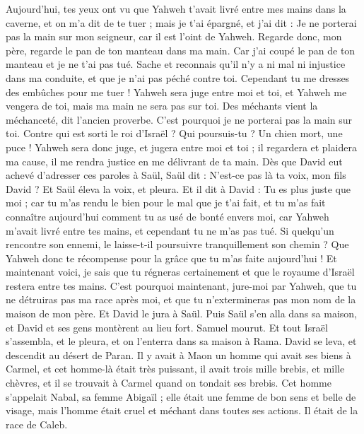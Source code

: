 \begin{multicols}{2}
Aujourd'hui, tes yeux ont vu que Yahweh t'avait livré entre mes mains dans la caverne, et on m'a dit de te tuer ; mais je t'ai épargné, et j'ai dit : Je ne porterai pas la main sur mon seigneur, car il est l'oint de Yahweh.
Regarde donc, mon père, regarde le pan de ton manteau dans ma main. Car j’ai coupé le pan de ton manteau et je ne t'ai pas tué. Sache et reconnais qu'il n'y a ni mal ni injustice dans ma conduite, et que je n'ai pas péché contre toi. Cependant tu me dresses des embûches pour me tuer !
Yahweh sera juge entre moi et toi, et Yahweh me vengera de toi, mais ma main ne sera pas sur toi.
Des méchants vient la méchanceté, dit l’ancien proverbe. C'est pourquoi je ne porterai pas la main sur toi.
Contre qui est sorti le roi d'Israël ? Qui poursuis-tu ? Un chien mort, une puce !
Yahweh sera donc juge, et jugera entre moi et toi ; il regardera et plaidera ma cause, il me rendra justice en me délivrant de ta main.
Dès que David eut achevé d’adresser ces paroles à Saül, Saül dit : N'est-ce pas là ta voix, mon fils David ? Et Saül éleva la voix, et pleura.
Et il dit à David : Tu es plus juste que moi ; car tu m'as rendu le bien pour le mal que je t'ai fait,
et tu m'as fait connaître aujourd'hui comment tu as usé de bonté envers moi, car Yahweh m'avait livré entre tes mains, et cependant tu ne m'as pas tué.
Si quelqu’un rencontre son ennemi, le laisse-t-il poursuivre tranquillement son chemin ? Que Yahweh donc te récompense pour la grâce que tu m'as faite aujourd'hui !
Et maintenant voici, je sais que tu régneras certainement et que le royaume d'Israël restera entre tes mains.
C'est pourquoi maintenant, jure-moi par Yahweh, que tu ne détruiras pas ma race après moi, et que tu n'extermineras pas mon nom de la maison de mon père.
Et David le jura à Saül. Puis Saül s'en alla dans sa maison, et David et ses gens montèrent au lieu fort.
\VerseOne{}Samuel mourut. Et tout Israël s'assembla, et le pleura, et on l'enterra dans sa maison à Rama. David se leva, et descendit au désert de Paran.
Il y avait à Maon un homme qui avait ses biens à Carmel, et cet homme-là était très puissant, il avait trois mille brebis, et mille chèvres, et il se trouvait à Carmel quand on tondait ses brebis.
Cet homme s’appelait Nabal, sa femme Abigaïl ; elle était une femme de bon sens et belle de visage, mais l’homme était cruel et méchant dans toutes ses actions. Il était de la race de Caleb.

\end{multicols}
